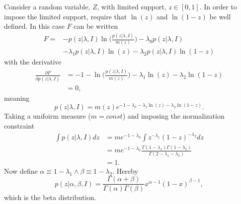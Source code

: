 \begin{example}
	Consider a random variable, $Z$, with limited support, $z\in [0,1]$. In order to impose the limited support, require that $\ln(z)$ and $\ln(1-z)$ be well defined. In this case $F$ can be written\label{ex:beta}
	\begin{equation}
		\begin{split}
			F =& -p(z|\lambda,I)\ln\bigg(\frac{p(z|\lambda,I)}{m(z)}\bigg)-\lambda_0p(z|\lambda,I)\\
			&-\lambda_1p(z|\lambda,I)\ln(z)-\lambda_2p(z|\lambda,I)\ln(1-z)
		\end{split}
	\end{equation}
	with the derivative
	\begin{equation}
		\begin{split}
			\frac{\partial F}{\partial p(z|\lambda,I)} &= -1-\ln\bigg(\frac{p(z|\lambda,I)}{m(z)}\bigg)-\lambda_1\ln(z)-\lambda_2\ln(1-z)\\
			&=0,
		\end{split}
	\end{equation}
	meaning
	\begin{equation}
		p(z|\lambda,I)=m(z)e^{-1-\lambda_0-\lambda_1\ln(z)-\lambda_2\ln(1-z)}.
	\end{equation}
	Taking a unifoirm measure ($m= const$) and imposing the normalization constraint
	\begin{equation}
		\begin{split}
			\int p(z|\lambda,I) dz &= me^{-1-\lambda_0}\int z^{-\lambda_1}(1-z)^{-\lambda_2}dz\\
			&= me^{-1-\lambda_0}\frac{\Gamma(1-\lambda_1)\Gamma(1-\lambda_2)}{\Gamma(2-\lambda_1-\lambda_2)}\\
			&=1.
		\end{split}
	\end{equation}
	Now define $\alpha \equiv 1-\lambda_1\wedge \beta \equiv 1-\lambda_2$. Hereby
	\begin{equation}
		p(z|\alpha,\beta,I) = \frac{\Gamma(\alpha+\beta)}{\Gamma(\alpha)\Gamma(\beta)}x^{\alpha-1}(1-x)^{\beta-1},
	\end{equation}
	which is the beta distribution. 
\end{example}


